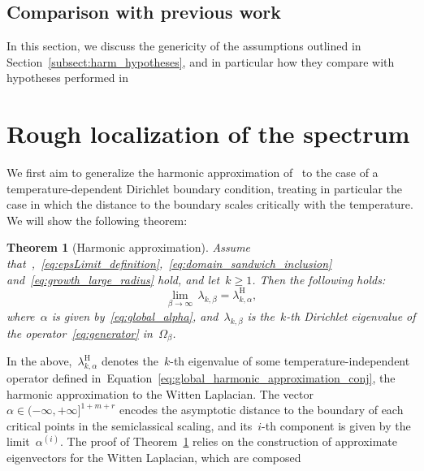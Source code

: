 \documentclass[10pt]{article}
\newcommand{\1}{\mathbbm 1}
\newcommand{\epsLimit}[1]{\alpha^{(#1)}} %
\newtheorem{theorem}{Theorem}
\begin{document}
    \subsection{Comparison with previous work}
    In this section, we discuss the genericity of the assumptions outlined in Section~\ref{subsect:harm_hypotheses}, and in particular how they compare with hypotheses performed in 
    \section{Rough localization of the spectrum}
    \label{sec:harm}
    We first aim to generalize the harmonic approximation of~\cite{S83} to the case of a temperature-dependent Dirichlet boundary condition, treating in particular the case in which the distance to the boundary scales critically with the temperature.
    We will show the following theorem:
    \begin{theorem}[Harmonic approximation]
        \label{thm:harm_approx}
        Assume that~,~\eqref{eq:epsLimit_definition},~\eqref{eq:domain_sandwich_inclusion} and~\eqref{eq:growth_large_radius} hold, and let~$k\geq 1$. Then the following holds:
        \begin{equation}
            \label{eq:harm_limit}
            \underset{\beta\to\infty}{\lim}\,\lambda_{k,\beta} = \lambda_{k,\alpha}^{\mathrm{H}},
        \end{equation}
        where~$\alpha$ is given by~\eqref{eq:global_alpha}, and~$\lambda_{k,\beta}$ is the~$k$-th Dirichlet eigenvalue of the operator~\eqref{eq:generator} in~$\Omega_\beta$.
    \end{theorem}
    In the above,~$\lambda_{k,\alpha}^{\mathrm H}$ denotes the~$k$-th eigenvalue of some temperature-independent operator defined in~Equation~\eqref{eq:global_harmonic_approximation_conj}, the harmonic approximation to the Witten Laplacian. The vector~$\alpha\in(-\infty,+\infty]^{1+m+r}$ encodes the asymptotic distance to the boundary of each critical points in the semiclassical scaling, and its~$i$-th component is given by the limit~$\epsLimit{i}$.
    The proof of Theorem~\ref{thm:harm_approx} relies on the construction of approximate eigenvectors for the Witten Laplacian, which are composed 
\end{document}

